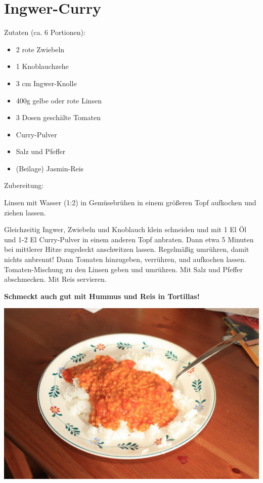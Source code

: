\section{Ingwer-Curry}
Zutaten (ca. 6 Portionen):
\begin{itemize}
    \item 2 rote Zwiebeln
    \item 1 Knoblauchzehe
    \item 3 cm Ingwer-Knolle
    \item 400g gelbe oder rote Linsen
    \item 3 Dosen geschälte Tomaten
    \item Curry-Pulver
    \item Salz und Pfeffer
    \item (Beilage) Jasmin-Reis
\end{itemize}

\noindent Zubereitung:

\noindent Linsen mit Wasser (1:2) in Gemüsebrühen in einem größeren Topf
aufkochen und ziehen lassen.

\noindent Gleichzeitig Ingwer, Zwiebeln und Knoblauch klein schneiden und mit 1
El Öl und 1-2 El Curry-Pulver in einem anderen Topf anbraten. Dann etwa 5
Minuten bei mittlerer Hitze zugedeckt anschwitzen lassen. Regelmäßig umrühren,
damit nichts anbrennt! Dann Tomaten hinzugeben, verrühren, und aufkochen
lassen. Tomaten-Mischung zu den Linsen geben und umrühren. Mit Salz und Pfeffer
abschmecken. Mit Reis servieren.

\noindent \textbf{Schmeckt auch gut mit Hummus und Reis in Tortillas!}

\newpage
\mbox{}
\vfill
\begin{center}
    \includegraphics[width=\textwidth]{Ingwer-Curry/IMG_6088._small.jpg}
\end{center}
\vfill
\mbox{ }
\newpage
